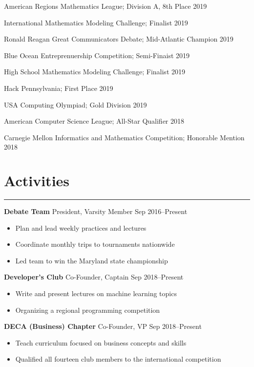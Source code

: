 \documentclass[11pt]{article}
\newcommand{\resumesection}[1]{\vspace{-0.3cm}\section*{\color{highlight}#1}\vspace{-0.3cm}\hrule\vspace{0.3cm}}
\begin{document}
American Regions Mathematics League; Division A, 8th Place \hfill 2019 \par
International Mathematics Modeling Challenge; Finalist \hfill 2019\par
Ronald Reagan Great Communicators Debate; Mid-Atlantic Champion \hfill 2019 \par
Blue Ocean Entreprenuership Competition; Semi-Finaist \hfill 2019 \par
High School Mathematics Modeling Challenge; Finalist \hfill 2019\par
Hack Pennsylvania; First Place \hfill 2019\par
USA Computing Olympiad; Gold Division \hfill 2019\par
American Computer Science League; All-Star Qualifier \hfill 2018 \par 
Carnegie Mellon Informatics and Mathematics Competition; Honorable Mention \hfill 2018\par


\resumesection{Activities}

\textbf{Debate Team} President, Varsity Member \hfill Sep 2016--Present \par
\begin{itemize}
	\item Plan and lead weekly practices and lectures
	\item Coordinate monthly trips to tournaments nationwide
	\item Led team to win the Maryland state championship
\end{itemize}\vspace{0.1cm}

\textbf{Developer's Club} Co-Founder, Captain \hfill Sep 2018--Present \par
\begin{itemize}
	\item Write and present lectures on machine learning topics
	\item Organizing a regional programming competition
\end{itemize}\vspace{0.1cm}

\textbf{DECA (Business) Chapter} Co-Founder, VP \hfill Sep 2018--Present \par
\begin{itemize}
	\item Teach curriculum focused on business concepts and skills
	\item Qualified all fourteen club members to the international competition
\end{itemize}\vspace{0.1cm}
\end{document}
